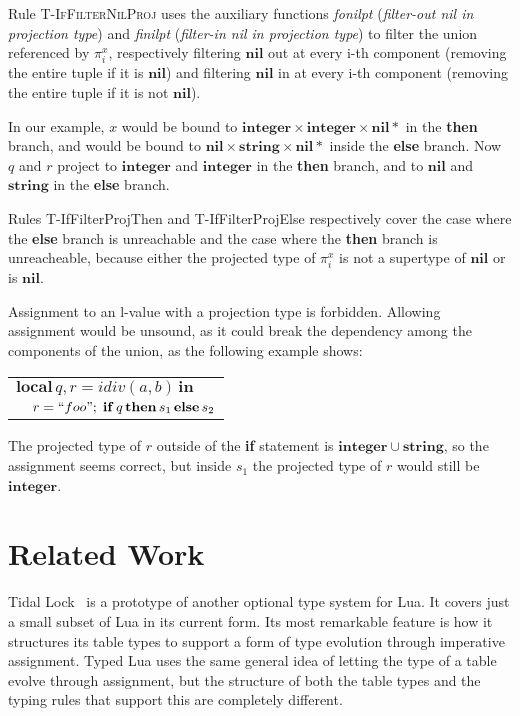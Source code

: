 \documentclass[preprint]{sigplanconf}
\newcommand{\Nil}{\mathbf{nil}}
\newcommand{\Integer}{\mathbf{integer}}
\newcommand{\String}{\mathbf{string}}
\begin{document}
Rule \textsc{T-IfFilterNilProj} uses the auxiliary functions \emph{fonilpt} ({\em filter-out nil in projection type}) and \emph{finilpt} ({\em filter-in nil in projection type}) to
filter the union referenced by $\pi_{i}^{x}$, respectively
filtering $\Nil$ out at every i-th component (removing
the entire tuple if it is $\Nil$) and filtering $\Nil$ in at every i-th component (removing the entire tuple if it is not $\Nil$).

In our example, $x$ would be bound to $\Integer \times \Integer \times \Nil{*}$ in the {\bf then} branch, and would be bound
to $\Nil \times \String \times \Nil{*}$ inside the {\bf else}
branch. Now $q$ and $r$ project to $\Integer$ and $\Integer$
in the {\bf then} branch, and to $\Nil$ and $\String$ in the
{\bf else} branch. 

Rules {\sc T-IfFilterProjThen} and {\sc T-IfFilterProjElse}
respectively cover the case where the {\bf else} branch is unreachable and the case where the {\bf then} branch is unreacheable, because either the projected type of $\pi_i^x$
is not a supertype of $\Nil$ or is $\Nil$.

Assignment to an l-value with a projection type is forbidden. Allowing assignment
would be unsound, as it could break the dependency among the
components of the union, as the following example shows:
\begin{center}
	\begin{tabular}{ll}
		\multicolumn{2}{l}{$\mathbf{local} \, q, r = idiv(a, b) \, \mathbf{in}$} \\
		&  $r = ``foo" ;\; \mathbf{if} \, q \, \mathbf{then} \, s_1 \, \mathbf{else} \, s_2$
	\end{tabular}
\end{center}

The projected type of $r$ outside of the {\bf if} statement
is $\Integer \cup \String$, so the assignment seems correct,
but inside $s_1$ the projected type of $r$ would still be
$\Integer$.

\section{Related Work}
\label{sec:related}

Tidal Lock~\cite{tidallock} is a prototype of another optional type system for Lua. It covers just a small subset of Lua
in its current form. Its most remarkable feature is
how it structures its table types to support a form of type
evolution through imperative assignment. Typed Lua uses
the same general idea of letting the type of a table evolve
through assignment, but the structure of both the table types
and the typing rules that support this are completely different.
\end{document}
